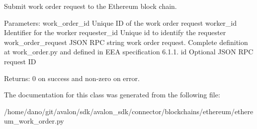 \begin{DoxyVerb}Submit work order request to the Ethereum block chain.

Parameters:
work_order_id      Unique ID of the work order request
worker_id          Identifier for the worker
requester_id       Unique id to identify the requester
work_order_request JSON RPC string work order request.
           Complete definition at work_order.py and
           defined in EEA specification 6.1.1.
id                 Optional JSON RPC request ID

Returns:
0 on success and non-zero on error.
\end{DoxyVerb}
 

The documentation for this class was generated from the following file\+:\begin{DoxyCompactItemize}
\item 
/home/dano/git/avalon/sdk/avalon\+\_\+sdk/connector/blockchains/ethereum/ethereum\+\_\+work\+\_\+order.\+py\end{DoxyCompactItemize}
